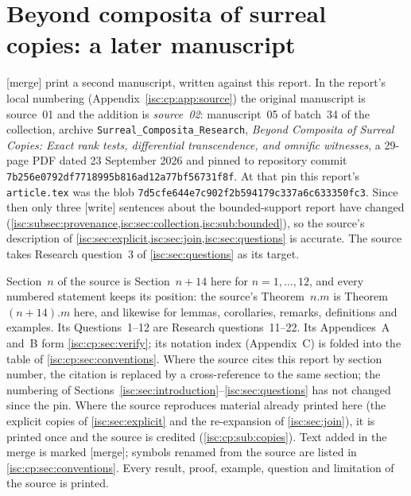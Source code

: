 \documentclass[11pt,letterpaper]{article}
\theoremstyle{definition}
\theoremstyle{remark}
\newcommand{\wtag}{\textup{[write]}}%
\newcommand{\mtag}{\textup{[merge]}}%
\numberwithin{equation}{section}
\begin{document}
\section{Beyond composita of surreal copies: a later manuscript}
\label{isc:cp:sec:intro}

\mtag{} 
print a second manuscript, written against this report. In the report's
local numbering (Appendix~\ref{isc:cp:app:source}) the original manuscript
is source~01 and the addition is \emph{source~02}: manuscript~05 of batch~34
of the collection, archive \texttt{Surreal\_Composita\_Research},
\emph{Beyond Composita of Surreal Copies: Exact rank tests, differential
transcendence, and omnific witnesses}, a 29-page PDF dated 23 September
2026 and pinned to repository commit
\nolinkurl{7b256e0792df7718995b816ad12a77bf56731f8f}. At that pin this
report's \texttt{article.tex} was the blob
\nolinkurl{7d5cfe644e7c902f2b594179c337a6c633350fc3}. Since then only
three \wtag{} sentences about the bounded-support report have changed
(\cref{isc:subsec:provenance,isc:sec:collection,isc:sub:bounded}), so the
source's description of \cref{isc:sec:explicit,isc:sec:join,isc:sec:questions}
is accurate. The source takes Research question~3 of
\cref{isc:sec:questions} as its target.

Section~$n$ of the source is Section~$n+14$ here for $n=1,\ldots,12$, and
every numbered statement keeps its position: the source's Theorem~$n.m$ is
Theorem~$(n+14).m$ here, and likewise for lemmas, corollaries, remarks,
definitions and examples. Its Questions~1--12 are Research
questions~11--22. Its Appendices~A and~B form \cref{isc:cp:sec:verify}; its
notation index (Appendix~C) is folded into the table of
\cref{isc:cp:sec:conventions}. Where the source cites this report by section
number, the citation is replaced by a cross-reference to the same section;
the numbering of Sections~\ref{isc:sec:introduction}--\ref{isc:sec:questions} has not
changed since the pin. Where the source reproduces material already printed
here (the explicit copies of \cref{isc:sec:explicit} and the re-expansion of
\cref{isc:sec:join}), it is printed once and the source is credited
(\cref{isc:cp:sub:copies}). Text added in the merge is marked \mtag; symbols
renamed from the source are listed in \cref{isc:cp:sec:conventions}. Every
result, proof, example, question and limitation of the source is printed.
\end{document}
